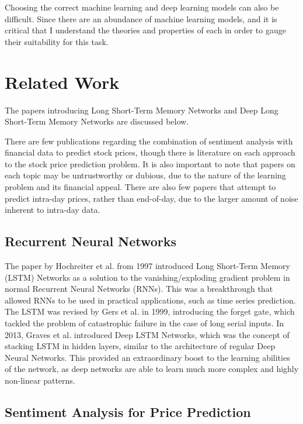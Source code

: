 \documentclass[12pt,a4paper,twoside,openright]{report}
\begin{document}
Choosing the correct machine learning and deep learning models can also be difficult. Since
there are an abundance of machine learning models, and it is critical that I understand the theories and
properties of each in order to gauge their suitability for this task.

\section{Related Work}

The papers introducing Long Short-Term Memory Networks and Deep Long Short-Term
Memory Networks are discussed below.

There are few publications regarding the combination of sentiment analysis with financial data to predict stock
prices, though there is literature on each approach to the stock price prediction problem.
It is also important to note that papers on each topic may be untrustworthy or dubious, due to the nature of
the learning problem and its financial appeal. There are also few papers that attempt to predict intra-day
prices, rather than end-of-day, due to the larger amount of noise inherent to intra-day data.

\subsection{Recurrent Neural Networks}

The paper by Hochreiter et al. from 1997 introduced Long Short-Term Memory (LSTM) Networks
as a solution to the vanishing/exploding gradient problem in normal Recurrent Neural Networks (RNNs)\cite{Hochreiter97}.
This was a breakthrough that allowed RNNs to be used in practical applications, such as time series
prediction. The LSTM was revised by Gers et al. in 1999, introducing the forget gate, which tackled
the problem of catastrophic failure in the case of long serial inputs\cite{Gers99}.
In 2013, Graves et al. introduced Deep LSTM Networks, which was the concept of
stacking LSTM in hidden layers, similar to the architecture of regular Deep Neural Networks. This provided
an extraordinary boost to the learning abilities of the network, as deep networks are able to learn much
more complex and highly non-linear patterns\cite{Graves13}.

\subsection{Sentiment Analysis for Price Prediction}
\end{document}
